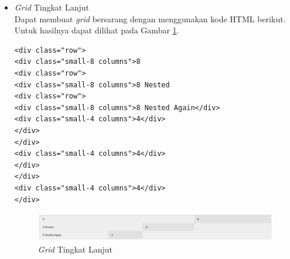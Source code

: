 \begin{itemize}
\begin{itemize}
\begin{enumerate}[(1)]
\begin{itemize}
\item {\it Grid} Tingkat Lanjut\\
Dapat membuat {\it grid} bersarang dengan menggunakan kode HTML berikut. Untuk
hasilnya dapat dilihat pada Gambar \ref{fig:gridadv}.
\begin{lstlisting}[basicstyle=\footnotesize]
<div class="row">
<div class="small-8 columns">8
<div class="row">
<div class="small-8 columns">8 Nested
<div class="row">
<div class="small-8 columns">8 Nested Again</div>
<div class="small-4 columns">4</div>
</div>
</div>
<div class="small-4 columns">4</div>
</div>
</div>
<div class="small-4 columns">4</div>
</div>
\end{lstlisting}
\begin{figure}[H]
\centering
\includegraphics[scale=0.6]{Gambar/gridadv.png}
\caption[{\it Grid} Tingkat Lanjut]{{\it Grid} Tingkat Lanjut}
\label{fig:gridadv}
\end{figure}


\end{itemize}
\end{enumerate}
\end{itemize}
\end{itemize}
